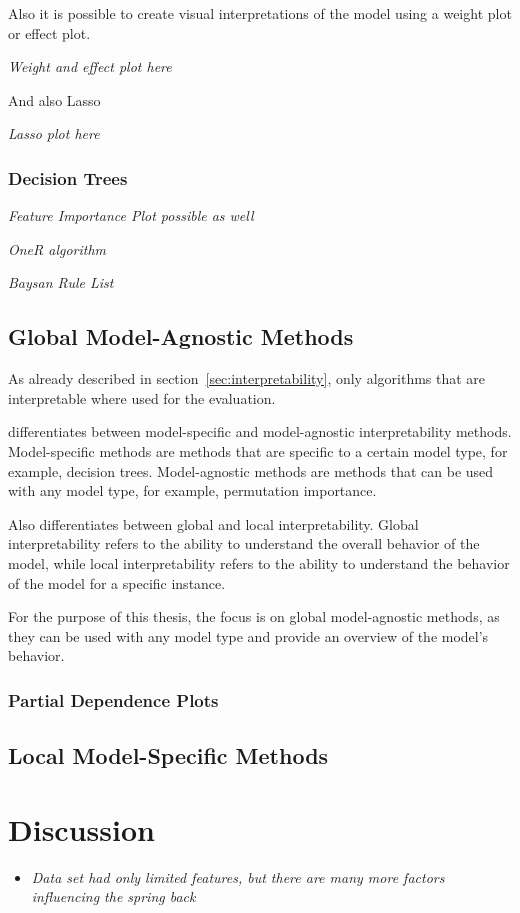 Also it is possible to create visual interpretations of the model using
a weight plot or effect plot.

\textit{Weight and effect plot here}

And also Lasso

\textit{Lasso plot here}

\subsubsection{Decision Trees}\label{subsubsec:decision-trees}

\textit{Feature Importance Plot possible as well}

\textit{OneR algorithm}

\textit{Baysan Rule List}


\subsection*{Global Model-Agnostic Methods}
As already described in section~\ref{sec:interpretability}, only algorithms
that are
interpretable where used for the evaluation.

\cite{molnar2020interpretable} differentiates between
model-specific and model-agnostic interpretability methods.
Model-specific methods are methods that are specific to a certain model type, for example,
decision trees.
Model-agnostic methods are methods that can be used with any model type, for
example, permutation importance.

Also \cite{molnar2020interpretable} differentiates between global and local
interpretability. Global
interpretability refers to the ability to understand the overall behavior of
the model, while
local interpretability refers to the ability to understand the behavior of
the model for a
specific instance.

For the purpose of this thesis, the focus is on global model-agnostic
methods, as they can be used
with any model type and provide an overview of the model's behavior.

\subsubsection*{Partial Dependence Plots}

\subsection{Local Model-Specific
Methods}\label{subsec:local-model-specific-methods}

\section[]{Discussion}\label{sec:discussion}



\begin{itemize}
    \item \textit{Data set had only limited features, but there are many more factors
    influencing
    the spring back}
\end{itemize}

